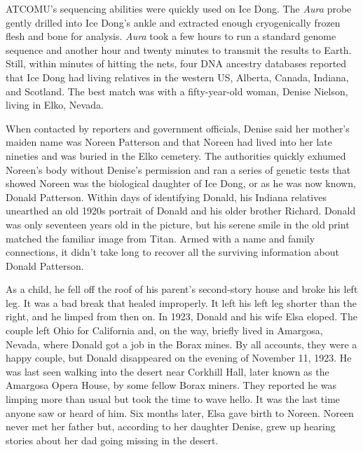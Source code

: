 ATCOMU's sequencing abilities were quickly used on Ice Dong. The
\emph{Aura} probe gently drilled into Ice Dong's ankle and extracted
enough cryogenically frozen flesh and bone for analysis. \emph{Aura}
took a few hours to run a standard genome sequence and another hour and
twenty minutes to transmit the results to Earth. Still, within minutes
of hitting the nets, four DNA ancestry databases reported that Ice Dong
had living relatives in the western US, Alberta, Canada, Indiana, and
Scotland. The best match was with a fifty-year-old woman, Denise
Nielson, living in Elko, Nevada.

When contacted by reporters and government officials, Denise said her
mother's maiden name was Noreen Patterson and that Noreen had lived into
her late nineties and was buried in the Elko cemetery. The authorities
quickly exhumed Noreen's body without Denise's permission and ran a
series of genetic tests that showed Noreen was the biological daughter
of Ice Dong, or as he was now known, Donald Patterson. Within days of
identifying Donald, his Indiana relatives unearthed an old 1920s
portrait of Donald and his older brother Richard. Donald was only
seventeen years old in the picture, but his serene smile in the old
print matched the familiar image from Titan. Armed with a name and
family connections, it didn't take long to recover all the surviving
information about Donald Patterson.

As a child, he fell off the roof of his parent's second-story house and
broke his left leg. It was a bad break that healed improperly. It left
his left leg shorter than the right, and he limped from then on. In
1923, Donald and his wife Elsa eloped. The couple left Ohio for
California and, on the way, briefly lived in Amargosa, Nevada, where
Donald got a job in the Borax mines. By all accounts, they were a happy
couple, but Donald disappeared on the evening of November 11, 1923. He
was last seen walking into the desert near Corkhill Hall, later known as
the Amargosa Opera House, by some fellow Borax miners. They reported he
was limping more than usual but took the time to wave hello. It was the
last time anyone saw or heard of him. Six months later, Elsa gave birth
to Noreen. Noreen never met her father but, according to her daughter
Denise, grew up hearing stories about her dad going missing in the
desert.

